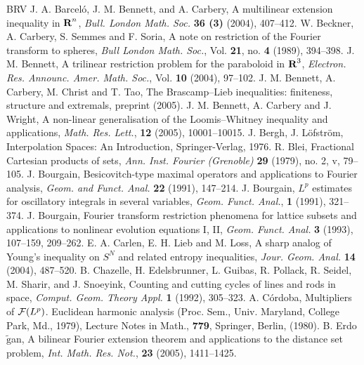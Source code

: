 \begin{thebibliography}{BRV}
 J. A. Barcel\'o, J. M. Bennett, and A. Carbery,
A multilinear extension inequality in ${\hbox{\bf R}}^{n}$,
\textit{Bull. London Math. Soc.} {\bf 36 (3)} (2004), 407--412.
 W. Beckner, A. Carbery, S. Semmes and F. Soria, A
note on restriction of the Fourier transform to spheres,
\textit{Bull London Math. Soc.}, Vol. {\bf 21}, no. {\bf 4}
(1989), 394--398.
 J. M. Bennett, A trilinear restriction problem for the
paraboloid in ${\hbox{\bf R}}^{3}$, \textit{Electron. Res. Announc. Amer.
Math. Soc.}, Vol. {\bf 10} (2004), 97--102.
 J. M. Bennett, A. Carbery, M. Christ and T. Tao,
The Brascamp--Lieb inequalities: finiteness, structure and
extremals, preprint (2005).
J. M. Bennett, A. Carbery and J. Wright, A non-linear
generalisation of the Loomis--Whitney inequality and applications,
\textit{Math. Res. Lett.}, {\bf 12} (2005), 10001--10015.
J. Bergh, J. L\"ofstr\"om, Interpolation Spaces: An Introduction,
Springer-Verlag, 1976.
 R. Blei, Fractional Cartesian products of sets, \textit{Ann. Inst. Fourier (Grenoble)}
{\bf 29} (1979), no. 2, v, 79--105.
 J. Bourgain, Besicovitch-type maximal operators and applications
to Fourier analysis, \textit{Geom. and Funct. Anal.} {\bf 22}
(1991), 147--214.
 J. Bourgain, $L^p$ estimates for oscillatory
integrals in several variables, \textit{Geom. Funct. Anal.}, {\bf
1} (1991), 321--374.
J. Bourgain, Fourier transform restriction phenomena for lattice
subsets and applications to nonlinear evolution equations I, II,
\textit{Geom. Funct. Anal.} {\bf 3} (1993), 107--159, 209--262.
 E. A. Carlen, E. H. Lieb and M. Loss, A
sharp analog of Young's inequality on $S^N$ and related entropy
inequalities, \textit{Jour. Geom. Anal.} {\bf 14} (2004),
487--520.
B. Chazelle, H. Edelsbrunner, L. Guibas, R. Pollack, R. Seidel, M.
Sharir, and J. Snoeyink, Counting and cutting cycles of lines and
rods in space, \textit{Comput. Geom. Theory Appl.} \textbf{1}
(1992), 305--323.
 A. C\'ordoba, Multipliers of ${\cal F}(L\sp{p})$.
Euclidean harmonic analysis (Proc. Sem., Univ. Maryland, College Park, Md., 1979),
Lecture Notes in Math., {\bf 779}, Springer, Berlin, (1980).
 B. Erdo$\tilde{\mbox{g}}$an, A bilinear Fourier extension
theorem and applications to the distance set problem, \textit{Int. Math. Res. Not.}, {\bf 23} (2005), 1411--1425.

\end{thebibliography}
